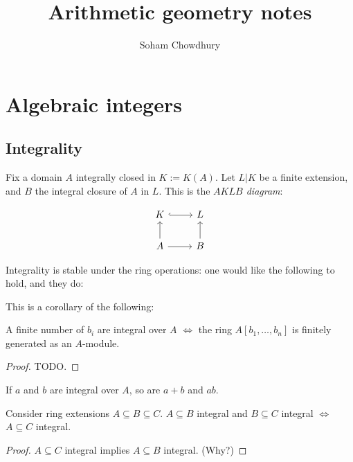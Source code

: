 \documentclass{memoir}
\title{Arithmetic geometry notes}
\author{Soham Chowdhury}
\begin{document}
\maketitle
\frontmatter
\tableofcontents*
\mainmatter

\chapter{Algebraic integers}

\section{Integrality}

Fix a domain $A$ integrally closed in $K := K(A)$. Let $L|K$ be a finite
extension, and $B$ the integral closure of $A$ in $L$. This is the \emph{$AKLB$
  diagram}:

\[
  \begin{tikzcd}
    K \arrow[r, hook] & L \\
    A \arrow[u] \arrow[r] & B \arrow[u]
  \end{tikzcd}
\]

Integrality is stable under the ring operations: one would like the following to
hold, and they do:

This is a corollary of the following:

\begin{theorem}{\label{module-integrality}}
  A finite number of $b_i$ are integral over $A$ $\iff$ the ring $A[b_1,\ldots,b_n]$ is
  finitely generated as an $A$-module.
\end{theorem}
\begin{proof}
  TODO.
\end{proof}

\begin{corollary}{\label{integrality-of-sums-products}}
  If $a$ and $b$ are integral over $A$, so are $a + b$ and $ab$.
\end{corollary}

\begin{theorem}{\label{integrality-trans}}
  Consider ring extensions $A \subseteq B \subseteq C$.
  $A \subseteq B$ integral and $B \subseteq C$ integral $\iff$ $A \subseteq C$ integral.
\end{theorem}
\begin{proof}
  $A \subseteq C$ integral implies $A \subseteq B$ integral. (Why?)
\end{proof}
\end{document}
